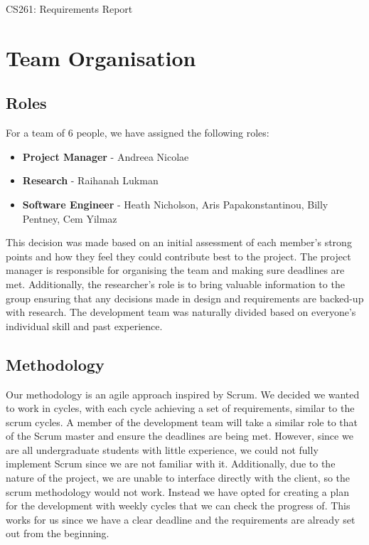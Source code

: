 \documentclass[a4paper]{article}
\theoremstyle{plain}
\theoremstyle{definition}
\theoremstyle{remark}
\begin{document}
\hline
\begin{center}
	\vspace{1mm}
	\Huge CS261: Requirements Report
\end{center}
\hline
\section*{Team Organisation}
\subsection*{Roles}
For a team of 6 people, we have assigned the following roles:
\begin{itemize}
	\item \textbf{Project Manager} - Andreea Nicolae 
	\item \textbf{Research} - Raihanah Lukman
	\item \textbf{Software Engineer} - Heath Nicholson, Aris Papakonstantinou, Billy Pentney, Cem Yilmaz
\end{itemize}
This decision was made based on an initial assessment of each member’s strong points and how they feel they could contribute best to the project. The project manager is responsible for organising the team and making sure deadlines are met. Additionally, the researcher’s role is to bring valuable information to the group ensuring that any decisions made in design and requirements are backed-up with research. The development team was naturally divided based on everyone’s individual skill and past experience.
\subsection*{Methodology}
Our methodology is an agile approach inspired by Scrum. We decided we wanted to work in cycles, with each cycle achieving a set of requirements, similar to the scrum cycles. A member of the development team will take a similar role to that of the Scrum master and ensure the deadlines are being met. However, since we are all undergraduate students with little experience, we could not fully implement Scrum since we are not familiar with it. Additionally, due to the nature of the project, we are unable to interface directly with the client, so the scrum methodology would not work. Instead we have opted for creating a plan for the development with weekly cycles that we can check the progress of. This works for us since we have a clear deadline and the requirements are already set out from the beginning. \\
\end{document}
